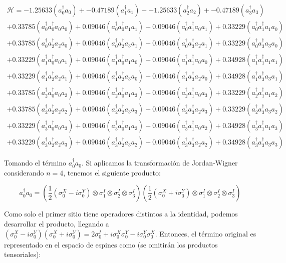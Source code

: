 \begin{multline*}
     \mathcal{H} = -1.25633( a_0^{\dag} a_0 ) + -0.47189( a_1^{\dag} a_1 ) + -1.25633( a_2^{\dag} a_2 ) + -0.47189( a_3^{\dag} a_3 ) \\
+ 0.33785( a_0^{\dag}a_0^{\dag} a_0 a_0 ) + 0.09046( a_0^{\dag} a_0^{\dag} a_1 a_1 ) + 0.09046( a_0^{\dag} a_1^{\dag} a_0 a_1 ) + 0.33229( a_0^{\dag} a_1^{\dag} a_1 a_0 ) \\
+ 0.33785( a_0^{\dag} a_2^{\dag} a_2 a_0 ) + 0.09046( a_0^{\dag} a_2^{\dag} a_3 a_1 ) + 0.09046( a_0^{\dag} a_3^{\dag} a_2 a_1 ) + 0.33229( a_0^{\dag} a_3^{\dag} a_3 a_0 ) \\
+ 0.33229( a_1^{\dag} a_0^{\dag} a_0 a_1 ) + 0.09046( a_1^{\dag} a_0^{\dag} a_1 a_0 ) + 0.09046( a_1^{\dag} a_1^{\dag} a_0 a_0 ) + 0.34928( a_1^{\dag} a_1^{\dag} a_1 a_1 ) \\
+ 0.33229( a_1^{\dag} a_2^{\dag} a_2 a_1 ) + 0.09046( a_1^{\dag} a_2^{\dag} a_3 a_0 ) + 0.09046( a_1^{\dag} a_3^{\dag} a_2 a_0 ) + 0.34928( a_1^{\dag} a_3^{\dag} a_3 a_1 ) \\
+ 0.33785( a_2^{\dag} a_0^{\dag} a_0 a_2 ) + 0.09046( a_2^{\dag} a_0^{\dag} a_1 a_3 ) + 0.09046( a_2^{\dag} a_1^{\dag} a_0 a_3 ) + 0.33229( a_2^{\dag} a_1^{\dag} a_1 a_2 ) \\
+ 0.33785( a_2^{\dag} a_2^{\dag} a_2 a_2 ) + 0.09046( a_2^{\dag} a_2^{\dag} a_3 a_3 ) + 0.09046( a_2^{\dag} a_3^{\dag} a_2 a_3 ) + 0.33229( a_2^{\dag} a_3^{\dag} a_3 a_2 ) \\
+ 0.33229( a_3^{\dag} a_0^{\dag} a_0 a_3 ) + 0.09046( a_3^{\dag} a_0^{\dag} a_1 a_2 ) + 0.09046( a_3^{\dag} a_1^{\dag} a_0 a_2 ) + 0.34928( a_3^{\dag} a_1^{\dag} a_1 a_3 ) \\
+ 0.33229( a_3^{\dag} a_2^{\dag} a_2 a_3 ) + 0.09046( a_3^{\dag} a_2^{\dag} a_3 a_2 ) + 0.09046( a_3^{\dag} a_3^{\dag} a_2 a_2 ) + 0.34928( a_3^{\dag} a_3^{\dag} a_3 a_3 ) 
\end{multline*}

Tomando el término $a_0^{\dag} a_0$. Si aplicamos la transformación de Jordan-Wigner considerando $n=4$, tenemos el siguiente producto:

\begin{equation*}
    a_0^{\dag} a_0 = (\frac{1}{2}(\sigma^X_0 -i\sigma^Y_0)\otimes\sigma^I_1\otimes\sigma^I_2\otimes\sigma^I_3) (\frac{1}{2}(\sigma^X_0 +i\sigma^Y_0)\otimes\sigma^I_1\otimes\sigma^I_2\otimes\sigma^I_3)
\end{equation*}

Como solo el primer sitio tiene operadores distintos a la identidad, podemos desarrollar el producto, llegando a $(\sigma^X_0 -i\sigma^Y_0)(\sigma^X_0 +i\sigma^Y_0) = 2\sigma_0^I + i\sigma_0^X\sigma_0^Y - i\sigma_0^Y\sigma_0^X$. Entonces, el término original es representado en el espacio de espines como (se omitirán los productos tensoriales):

